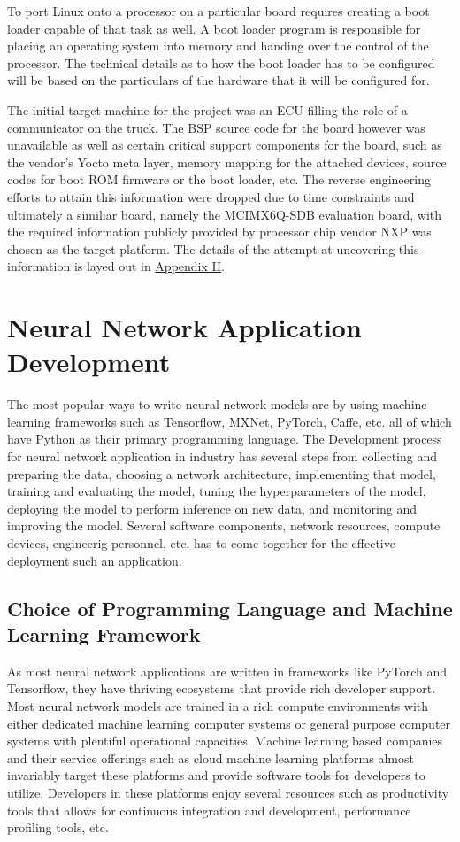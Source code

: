 To port Linux onto a processor on a particular board requires creating a boot loader capable of that task as well. A boot loader program is responsible for placing an operating system into memory and handing over the control of the processor. The technical details as to how the boot loader has to be configured will be based on the particulars of the hardware that it will be configured for.

The initial target machine for the project was an ECU filling the role of a communicator on the truck. The BSP source code for the board however was unavailable as well as certain critical support components for the board, such as the vendor's Yocto meta layer, memory mapping for the attached devices, source codes for boot ROM firmware or the boot loader, etc. The reverse engineering efforts to attain this information were dropped due to time constraints and ultimately a similiar board, namely the MCIMX6Q-SDB evaluation board, with the required information publicly provided by processor chip vendor NXP was chosen as the target platform. The details of the attempt at uncovering this information is layed out in \hyperref[rtc-c300]{Appendix II}.

\section{Neural Network Application Development}

The most popular ways to write neural network models are by using machine learning frameworks such as Tensorflow, MXNet, PyTorch, Caffe, etc. all of which have Python as their primary programming language. The Development process for neural network application in industry has several steps from collecting and preparing the data, choosing a network architecture, implementing that model, training and evaluating the model, tuning the hyperparameters of the model, deploying the model to perform inference on new data, and monitoring and improving the model. Several software components, network resources, compute devices, engineerig personnel, etc. has to come together for the effective deployment such an application.

\subsection{Choice of Programming Language and Machine Learning Framework}

As most neural network applications are written in frameworks like PyTorch and Tensorflow, they have thriving ecosystems that provide rich developer support. Most neural network models are trained in a rich compute environments with either dedicated machine learning computer systems or general purpose computer systems with plentiful operational capacities. Machine learning based companies and their service offerings such as cloud machine learning platforms almost invariably target these platforms and provide software tools for developers to utilize. Developers in these platforms enjoy several resources such as productivity tools that allows for continuous integration and development, performance profiling tools, etc.

